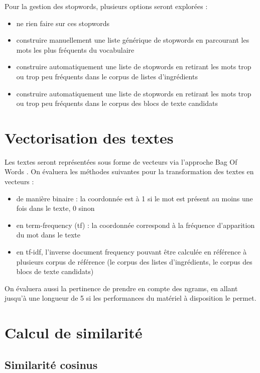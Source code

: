         Pour la gestion des stopwords, plusieurs options seront explorées : 
        \begin{itemize}
            \item ne rien faire sur ces stopwords
            \item construire manuellement une liste générique de stopwords en parcourant les mots les plus fréquents du vocabulaire
            \item construire automatiquement une liste de stopwords en retirant les mots trop ou trop peu fréquents dans le corpus de listes d'ingrédients
            \item construire automatiquement une liste de stopwords en retirant les mots trop ou trop peu fréquents dans le corpus des blocs de texte candidats
        \end{itemize}

        \section{Vectorisation des textes}

        Les textes seront représentées sous forme de vecteurs via l'approche \og Bag Of Words \fg.
        On évaluera les méthodes suivantes pour la transformation des textes en vecteurs :
        \begin{itemize}
            \item de manière binaire : la coordonnée est à 1 si le mot est présent au moins une fois dans le texte, 0 sinon
            \item en term-frequency (tf) : la coordonnée correspond à la fréquence d'apparition du mot dans le texte
            \item en tf-idf, l'inverse document frequency pouvant être calculée en référence à plusieurs corpus de référence (le corpus des listes d'ingrédients, le corpus des blocs de texte candidats)
        \end{itemize}

        On évaluera aussi la pertinence de prendre en compte des ngrams, en allant jusqu'à une longueur de 5 si les performances du matériel à disposition le permet.


        \section{Calcul de similarité}

            \subsection{Similarité cosinus}
            
